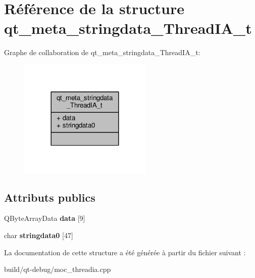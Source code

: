 \hypertarget{structqt__meta__stringdata__ThreadIA__t}{}\section{Référence de la structure qt\+\_\+meta\+\_\+stringdata\+\_\+\+Thread\+I\+A\+\_\+t}
\label{structqt__meta__stringdata__ThreadIA__t}


Graphe de collaboration de qt\+\_\+meta\+\_\+stringdata\+\_\+\+Thread\+I\+A\+\_\+t\+:
\nopagebreak
\begin{figure}[H]
\begin{center}
\leavevmode
\includegraphics[width=180pt]{structqt__meta__stringdata__ThreadIA__t__coll__graph}
\end{center}
\end{figure}
\subsection*{Attributs publics}
\begin{DoxyCompactItemize}
\item 
Q\+Byte\+Array\+Data {\bfseries data} \mbox{[}9\mbox{]}\hypertarget{structqt__meta__stringdata__ThreadIA__t_adc2391f3fe0841323c819b635169a35b}{}\label{structqt__meta__stringdata__ThreadIA__t_adc2391f3fe0841323c819b635169a35b}

\item 
char {\bfseries stringdata0} \mbox{[}47\mbox{]}\hypertarget{structqt__meta__stringdata__ThreadIA__t_a58839643ba0f368fcdee10486368e1de}{}\label{structqt__meta__stringdata__ThreadIA__t_a58839643ba0f368fcdee10486368e1de}

\end{DoxyCompactItemize}


La documentation de cette structure a été générée à partir du fichier suivant \+:\begin{DoxyCompactItemize}
\item 
build/qt-\/debug/moc\+\_\+threadia.\+cpp\end{DoxyCompactItemize}
